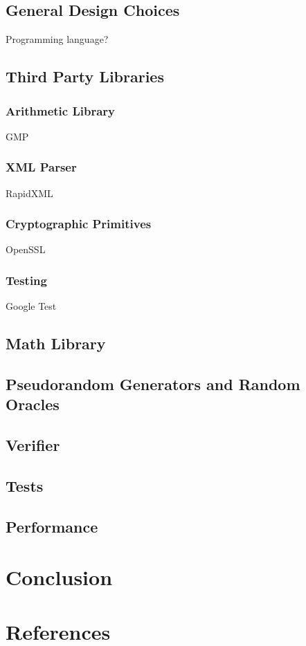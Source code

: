 \documentclass[10pt,a4paper]{article}
\begin{document}
\subsection{General Design Choices}

Programming language?


\subsection{Third Party Libraries}

\subsubsection{Arithmetic Library}
GMP

\subsubsection{XML Parser}
RapidXML

\subsubsection{Cryptographic Primitives}
OpenSSL

\subsubsection{Testing}
Google Test

\subsection{Math Library}

\subsection{Pseudorandom Generators and Random Oracles}

\subsection{Verifier}

\subsection{Tests}

\subsection{Performance}

\section{Conclusion}

\section{References}
\end{document}
